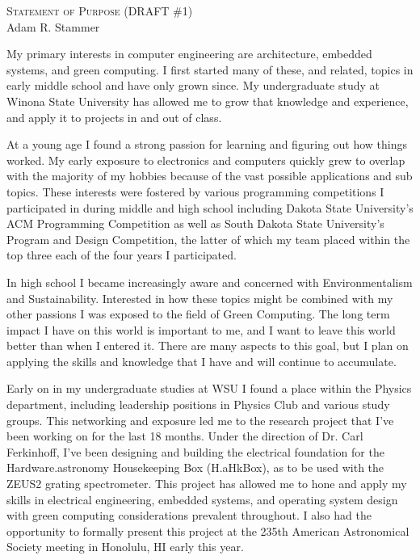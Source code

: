 \setlength{\oddsidemargin}{0in}
\setlength{\evensidemargin}{0in}
\setlength{\textwidth}{6.5in}
\setlength{\topmargin}{-.3in}
\setlength{\textheight}{9in}
\pagestyle{empty}



\newcommand{\university}{University of Minnesota }
\newcommand{\uni}{UMN }





\begin{center}
{\Large \huge \scshape Statement of Purpose (DRAFT \#1)} \\[.3in]
{\large Adam R. Stammer}
\end{center}

\vspace*{.1in}

My primary interests in computer engineering are architecture, embedded systems,
and green computing. I first started many of these, and related, topics in early middle school
and have only grown since. My undergraduate study at Winona State University has allowed me
to grow that knowledge and experience, and apply it to projects in and out of class.

At a young age I found a strong passion for learning and figuring out how things worked. My
early exposure to electronics and computers quickly grew to overlap with the majority of my
hobbies because of the vast possible applications and sub topics. These interests were
fostered by various programming competitions I participated in during middle and high school including 
Dakota State University's ACM Programming Competition as well as South Dakota State University's Program
and Design Competition, the latter of which my team placed within the top three each of the four years I
participated.

In high school I became increasingly aware and concerned with Environmentalism and Sustainability.
Interested in how these topics might be combined with my other passions I was exposed to the field
of Green Computing. The long term impact I have on this world is important to me, and I want to leave
this world better than when I entered it. There are many aspects to this goal, but I plan on applying the 
skills and knowledge that I have and will continue to accumulate. 

Early on in my undergraduate studies at WSU I found a place within the Physics department, including 
leadership positions in Physics Club and various study groups. This networking and exposure led me to
the research project that I've been working on for the last 18 months. Under the direction of Dr. Carl
Ferkinhoff, I've been designing and building the electrical foundation for the Hardware.astronomy 
Housekeeping Box (H.aHkBox), as to be used with the ZEUS2 grating spectrometer. This project has allowed
me to hone and apply my skills in electrical engineering, embedded systems, and operating system design
with green computing considerations prevalent throughout. I also had the opportunity to formally present
this project at the 235th American Astronomical Society meeting in Honolulu, HI early this year.

